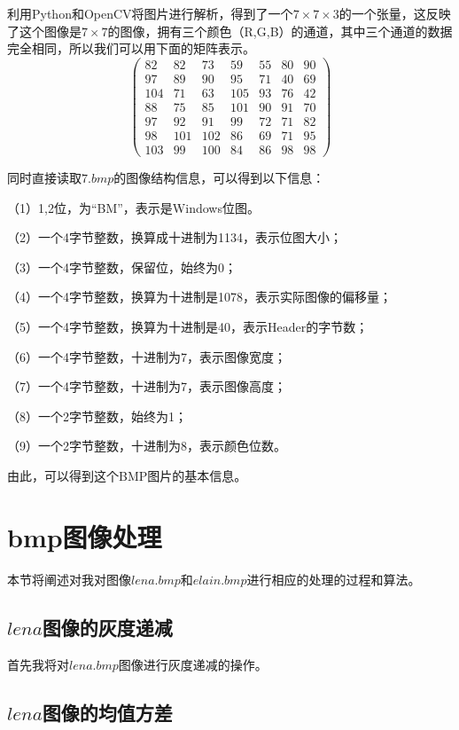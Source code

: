 \documentclass[UTF8]{ctexart}
\begin{document}
利用Python和OpenCV将图片进行解析，得到了一个$7\times7\times3$的一个张量，这反映了这个图像是$7\times7$的图像，拥有三个颜色（R,G,B）的通道，其中三个通道的数据完全相同，所以我们可以用下面的矩阵表示。
\[\left( \begin{array}{ccccccc}
82  & 82  & 73  & 59  & 55  & 80  & 90 \\
97  & 89  & 90  & 95  & 71  & 40  & 69 \\
104 & 71  & 63  & 105 & 93  & 76  & 42 \\
88  & 75  & 85  & 101 & 90  & 91  & 70 \\
97  & 92  & 91  & 99  & 72  & 71  & 82 \\
98  & 101 & 102 & 86  & 69  & 71  & 95 \\
103 & 99  & 100 & 84  & 86  & 98  & 98 
\end{array} \right)\]

同时直接读取$7.bmp$的图像结构信息，可以得到以下信息：

（1）1,2位，为``BM''，表示是Windows位图。

（2）一个4字节整数，换算成十进制为1134，表示位图大小； 

（3）一个4字节整数，保留位，始终为0； 

（4）一个4字节整数，换算为十进制是1078，表示实际图像的偏移量； 

（5）一个4字节整数，换算为十进制是40，表示Header的字节数； 

（6）一个4字节整数，十进制为7，表示图像宽度； 

（7）一个4字节整数，十进制为7，表示图像高度； 

（8）一个2字节整数，始终为1； 

（9）一个2字节整数，十进制为8，表示颜色位数。

由此，可以得到这个BMP图片的基本信息。

\section{bmp图像处理}

本节将阐述对我对图像$lena.bmp$和$elain.bmp$进行相应的处理的过程和算法。

\subsection{$lena$图像的灰度递减}

首先我将对$lena.bmp$图像进行灰度递减的操作。

\subsection{$lena$图像的均值方差}
\end{document}
